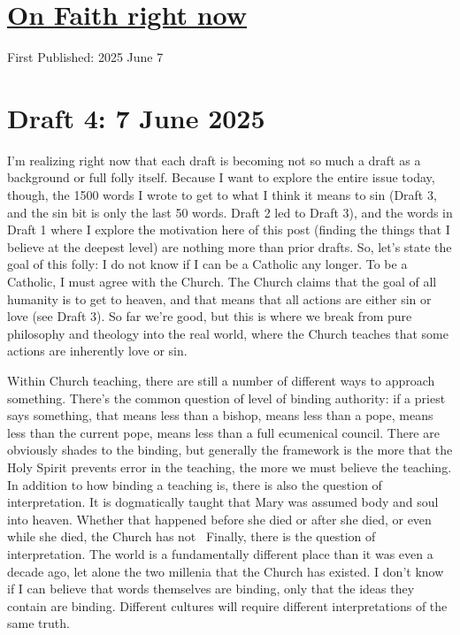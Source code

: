 \documentclass[12pt]{article}
\renewcommand{\,}{\textsuperscript{,}}
\begin{document}
  
\doublespacing  
\section{\href{faith.html}{On Faith right now}}  
First Published: 2025 June 7

\section{Draft 4: 7 June 2025}

I'm realizing right now that each draft is becoming not so much a draft as a background or full folly itself.  
Because I want to explore the entire issue today, though, the 1500 words I wrote to get to what I think it means to sin (Draft 3, and the sin bit is only the last 50 words. Draft 2 led to Draft 3), and the words in Draft 1 where I explore the motivation here of this post (finding the things that I believe at the deepest level) are nothing more than prior drafts.  
So, let's state the goal of this folly: I do not know if I can be a Catholic any longer.  
To be a Catholic, I must agree with the Church.  
The Church claims that the goal of all humanity is to get to heaven, and that means that all actions are either sin or love (see Draft 3).  
So far we're good, but this is where we break from pure philosophy and theology into the real world, where the Church teaches that some actions are inherently love or sin.

Within Church teaching, there are still a number of different ways to approach something.  
There's the common question of level of binding authority: if a priest says something, that means less than a bishop, means less than a pope, means less than the current pope, means less than a full ecumenical council.  
There are obviously shades to the binding, but generally the framework is the more that the Holy Spirit prevents error in the teaching, the more we must believe the teaching.  
In addition to how binding a teaching is, there is also the question of interpretation.  
It is dogmatically taught that Mary was assumed body and soul into heaven.  
Whether that happened before she died or after she died, or even while she died, the Church has not   
Finally, there is the question of interpretation.  
The world is a fundamentally different place than it was even a decade ago, let alone the two millenia that the Church has existed.  
I don't know if I can believe that words themselves are binding, only that the ideas they contain are binding.  
Different cultures will require different interpretations of the same truth.
\end{document}
